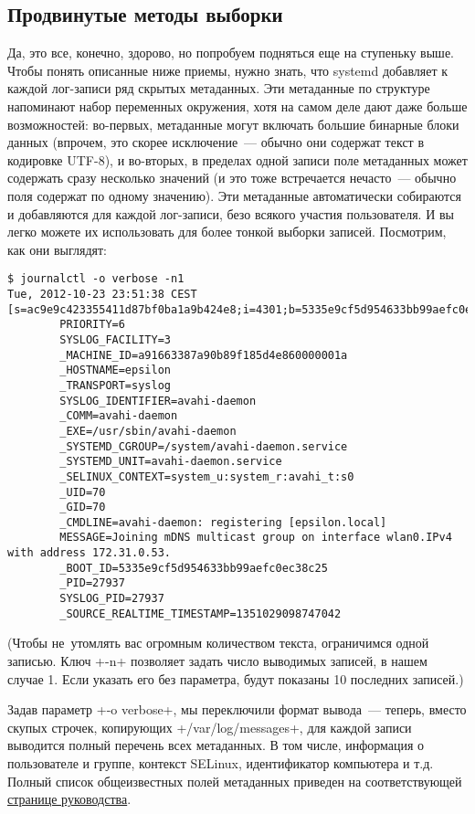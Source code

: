 \documentclass[10pt,oneside,a4paper]{article}
\begin{document}
\subsection{Продвинутые методы выборки}

Да, это все, конечно, здорово, но попробуем подняться еще на ступеньку выше.
Чтобы понять описанные ниже приемы, нужно знать, что systemd добавляет к
каждой лог-записи ряд скрытых метаданных. Эти метаданные по структуре напоминают
набор переменных окружения, хотя на самом деле дают даже больше возможностей:
во-первых, метаданные могут включать большие бинарные блоки данных (впрочем, это
скорее исключение~--- обычно они содержат текст в кодировке UTF-8), и во-вторых,
в пределах одной записи поле метаданных может содержать сразу несколько
значений (и это тоже встречается нечасто~--- обычно поля содержат по одному
значению). Эти метаданные автоматически собираются и добавляются для каждой
лог-записи, безо всякого участия пользователя. И вы легко можете их использовать
для более тонкой выборки записей. Посмотрим, как они выглядят:
\begin{Verbatim}
$ journalctl -o verbose -n1
Tue, 2012-10-23 23:51:38 CEST [s=ac9e9c423355411d87bf0ba1a9b424e8;i=4301;b=5335e9cf5d954633bb99aefc0ec38c25;m=882ee28d2;t=4ccc0f98326e6;x=f21e8b1b0994d7ee]
        PRIORITY=6
        SYSLOG_FACILITY=3
        _MACHINE_ID=a91663387a90b89f185d4e860000001a
        _HOSTNAME=epsilon
        _TRANSPORT=syslog
        SYSLOG_IDENTIFIER=avahi-daemon
        _COMM=avahi-daemon
        _EXE=/usr/sbin/avahi-daemon
        _SYSTEMD_CGROUP=/system/avahi-daemon.service
        _SYSTEMD_UNIT=avahi-daemon.service
        _SELINUX_CONTEXT=system_u:system_r:avahi_t:s0
        _UID=70
        _GID=70
        _CMDLINE=avahi-daemon: registering [epsilon.local]
        MESSAGE=Joining mDNS multicast group on interface wlan0.IPv4 with address 172.31.0.53.
        _BOOT_ID=5335e9cf5d954633bb99aefc0ec38c25
        _PID=27937
        SYSLOG_PID=27937
        _SOURCE_REALTIME_TIMESTAMP=1351029098747042
\end{Verbatim}
(Чтобы не~утомлять вас огромным количеством текста, ограничимся одной записью.
Ключ +-n+ позволяет задать число выводимых записей, в нашем случае 1. Если
указать его без параметра, будут показаны 10 последних записей.)

Задав параметр +-o verbose+, мы переключили формат вывода~--- теперь, вместо
скупых строчек, копирующих +/var/log/messages+, для каждой записи выводится
полный перечень всех метаданных. В том числе, информация о пользователе и
группе, контекст SELinux, идентификатор компьютера и т.д. Полный список
общеизвестных полей метаданных приведен на соответствующей
\href{http://www.freedesktop.org/software/systemd/man/systemd.journal-fields.html}%
{странице руководства}.
\end{document}

